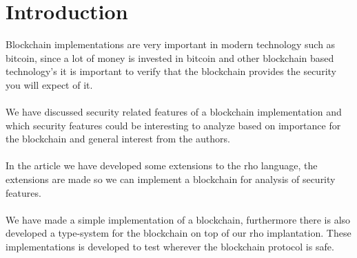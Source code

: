 \section{Introduction}
Blockchain implementations are very important in modern technology such as bitcoin, since a lot of money is invested in bitcoin and other blockchain based technology's it is important to verify that the blockchain provides the security you will expect of it.\\
\\
We have discussed security related features of a blockchain implementation and which security features could be interesting to analyze based on importance for the blockchain and general interest from the authors.\\
\\
In the article we have developed some extensions to the rho language, the extensions are made so we can implement a blockchain for analysis of security features.\\
\\
We have made a simple implementation of a blockchain, furthermore there is also developed a type-system for the blockchain on top of our rho implantation. These implementations is developed to test wherever the blockchain protocol is safe.